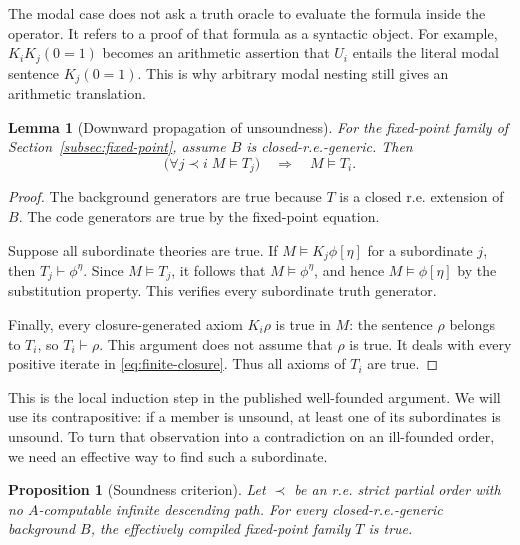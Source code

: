 \documentclass[11pt]{article}
\newtheorem{lemma}[theorem]{Lemma}
\newtheorem{proposition}[theorem]{Proposition}
\theoremstyle{definition}
\begin{document}
The modal case does not ask a truth oracle to evaluate the formula inside
the operator. It refers to a proof of that formula as a syntactic object.
For example, $K_iK_j(0=1)$ becomes an arithmetic assertion that $U_i$
entails the literal modal sentence $K_j(0=1)$. This is why arbitrary modal
nesting still gives an arithmetic translation.

\begin{lemma}[Downward propagation of unsoundness]\label{lem:local-step}
For the fixed-point family of Section~\ref{subsec:fixed-point}, assume $B$
is closed-r.e.-generic. Then
\begin{equation}\label{eq:local-step}
 \bigl(\forall j\prec i\;M\models T_j\bigr)
 \quad\Longrightarrow\quad M\models T_i.
\end{equation}
\end{lemma}

\begin{proof}
The background generators are true because $T$ is a closed r.e. extension
of $B$. The code generators are true by the fixed-point equation.

Suppose all subordinate theories are true. If
$M\models K_j\phi[\eta]$ for a subordinate $j$, then
$T_j\vdash\phi^\eta$. Since $M\models T_j$, it follows that
$M\models\phi^\eta$, and hence $M\models\phi[\eta]$ by the
substitution property. This verifies every subordinate truth generator.

Finally, every closure-generated axiom $K_i\rho$ is true in $M$: the
sentence $\rho$ belongs to $T_i$, so $T_i\vdash\rho$. This argument does
not assume that $\rho$ is true. It deals with every positive iterate in
\eqref{eq:finite-closure}. Thus all axioms of $T_i$ are true.
\end{proof}

This is the local induction step in the published well-founded argument.
We will use its contrapositive: if a member is unsound, at least one of its
subordinates is unsound. To turn that observation into a contradiction on
an ill-founded order, we need an effective way to find such a subordinate.

\begin{proposition}[Soundness criterion]\label{prop:criterion}
Let $\prec$ be an r.e. strict partial order with no $A$-computable infinite
descending path. For every closed-r.e.-generic background $B$, the
effectively compiled fixed-point family $T$ is true.
\end{proposition}
\end{document}
